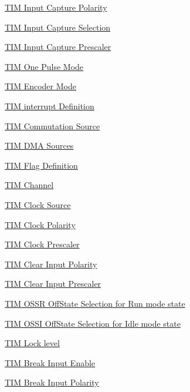 \begin{DoxyCompactItemize}
\item 
\hyperlink{group___t_i_m___input___capture___polarity}{T\+I\+M Input Capture Polarity}
\item 
\hyperlink{group___t_i_m___input___capture___selection}{T\+I\+M Input Capture Selection}
\item 
\hyperlink{group___t_i_m___input___capture___prescaler}{T\+I\+M Input Capture Prescaler}
\item 
\hyperlink{group___t_i_m___one___pulse___mode}{T\+I\+M One Pulse Mode}
\item 
\hyperlink{group___t_i_m___encoder___mode}{T\+I\+M Encoder Mode}
\item 
\hyperlink{group___t_i_m___interrupt__definition}{T\+I\+M interrupt Definition}
\item 
\hyperlink{group___t_i_m___commutation___source}{T\+I\+M Commutation Source}
\item 
\hyperlink{group___t_i_m___d_m_a__sources}{T\+I\+M D\+M\+A Sources}
\item 
\hyperlink{group___t_i_m___flag__definition}{T\+I\+M Flag Definition}
\item 
\hyperlink{group___t_i_m___channel}{T\+I\+M Channel}
\item 
\hyperlink{group___t_i_m___clock___source}{T\+I\+M Clock Source}
\item 
\hyperlink{group___t_i_m___clock___polarity}{T\+I\+M Clock Polarity}
\item 
\hyperlink{group___t_i_m___clock___prescaler}{T\+I\+M Clock Prescaler}
\item 
\hyperlink{group___t_i_m___clear_input___polarity}{T\+I\+M Clear Input Polarity}
\item 
\hyperlink{group___t_i_m___clear_input___prescaler}{T\+I\+M Clear Input Prescaler}
\item 
\hyperlink{group___t_i_m___o_s_s_r___off___state___selection__for___run__mode__state}{T\+I\+M O\+S\+S\+R Off\+State Selection for Run mode state}
\item 
\hyperlink{group___t_i_m___o_s_s_i___off___state___selection__for___idle__mode__state}{T\+I\+M O\+S\+S\+I Off\+State Selection for Idle mode state}
\item 
\hyperlink{group___t_i_m___lock__level}{T\+I\+M Lock level}
\item 
\hyperlink{group___t_i_m___break___input__enable__disable}{T\+I\+M Break Input Enable}
\item 
\hyperlink{group___t_i_m___break___polarity}{T\+I\+M Break Input Polarity}
\item 

\end{DoxyCompactItemize}
